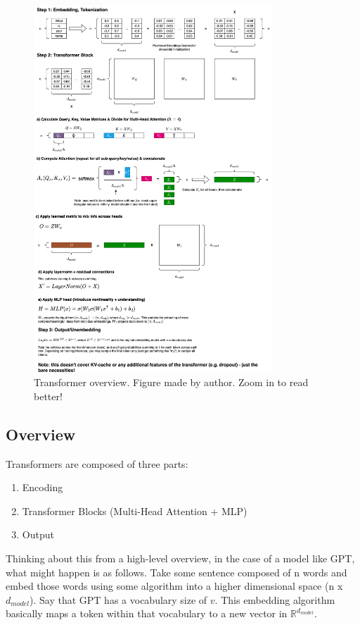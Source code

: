 \documentclass[12pt]{article}
\begin{document}
\begin{figure}[H]
    \centering
    \includegraphics[width=0.8\textwidth]{../media/transformer.png}
    \caption{Transformer overview. Figure made by author. Zoom in to read better!}
    \label{fig:transformer}
\end{figure}

\subsection{Overview}

Transformers are composed of three parts:
\begin{enumerate}
  \item Encoding
  \item Transformer Blocks (Multi-Head Attention + MLP)
  \item Output
\end{enumerate}

Thinking about this from a high-level overview, in the case of a model like GPT, what might happen is as follows. Take some sentence composed of n words and embed those words using some algorithm into a higher dimensional space (n x $d_{model}$). Say that GPT has a vocabulary size of $v$. This embedding algorithm basically maps a token within that vocabulary to a new vector in $\mathbb{R}^{d_{model}}$.
\end{document}
